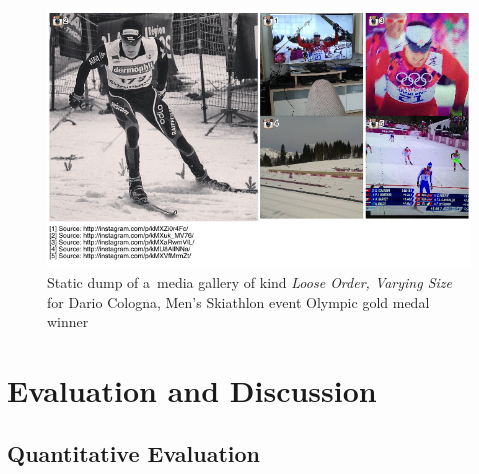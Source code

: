 \documentclass{sig-alternate}
\begin{document}
\begin{figure}[t!]
  \centering
  \includegraphics[width=0.75\columnwidth]{figures/dario_cologna/mediagallery_looseOrder_1391945454845.png}
  \caption{Static dump of a~media gallery of kind \emph{Loose Order, Varying Size}
  for Dario Cologna, Men's Skiathlon event Olympic gold medal winner}
  \label{fig:dario-cologna}    
\end{figure}


\section{Evaluation and Discussion}
\label{sec:evaluation-and-discussion}
\selectfont

\subsection{Quantitative Evaluation}
\end{document}

